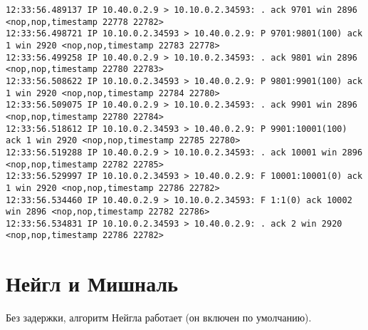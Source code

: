 \documentclass[a4paper,12pt]{article}
\begin{document}
\begin{lstlisting}
12:33:56.489137 IP 10.40.0.2.9 > 10.10.0.2.34593: . ack 9701 win 2896 <nop,nop,timestamp 22778 22782>
12:33:56.498721 IP 10.10.0.2.34593 > 10.40.0.2.9: P 9701:9801(100) ack 1 win 2920 <nop,nop,timestamp 22783 22778>
12:33:56.499258 IP 10.40.0.2.9 > 10.10.0.2.34593: . ack 9801 win 2896 <nop,nop,timestamp 22780 22783>
12:33:56.508622 IP 10.10.0.2.34593 > 10.40.0.2.9: P 9801:9901(100) ack 1 win 2920 <nop,nop,timestamp 22784 22780>
12:33:56.509075 IP 10.40.0.2.9 > 10.10.0.2.34593: . ack 9901 win 2896 <nop,nop,timestamp 22780 22784>
12:33:56.518612 IP 10.10.0.2.34593 > 10.40.0.2.9: P 9901:10001(100) ack 1 win 2920 <nop,nop,timestamp 22785 22780>
12:33:56.519288 IP 10.40.0.2.9 > 10.10.0.2.34593: . ack 10001 win 2896 <nop,nop,timestamp 22782 22785>
12:33:56.529997 IP 10.10.0.2.34593 > 10.40.0.2.9: F 10001:10001(0) ack 1 win 2920 <nop,nop,timestamp 22786 22782>
12:33:56.534460 IP 10.40.0.2.9 > 10.10.0.2.34593: F 1:1(0) ack 10002 win 2896 <nop,nop,timestamp 22782 22786>
12:33:56.534831 IP 10.10.0.2.34593 > 10.40.0.2.9: . ack 2 win 2920 <nop,nop,timestamp 22786 22782>
\end{lstlisting}

\section{Нейгл и Мишналь}

Без задержки, алгоритм Нейгла работает (он включен по умолчанию).
\end{document}
